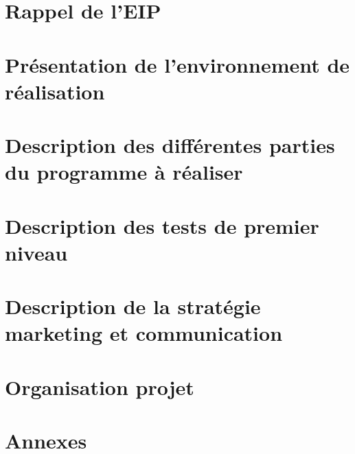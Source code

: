 \documentclass[11pt]{report}
\begin{document}
\tableofcontents
{}
\thispagestyle{empty}

\chapter{Rappel de l'EIP}
\thispagestyle{EIP} %
\setcounter{page}{1} %



\chapter{Présentation de l'environnement de réalisation}
\thispagestyle{EIP} %








\chapter{Description des différentes parties du programme à réaliser}
\thispagestyle{EIP} %


\chapter{Description des tests de premier niveau}
\thispagestyle{EIP} %


\chapter{Description de la stratégie marketing et communication}
\thispagestyle{EIP} %


\chapter{Organisation projet}
\thispagestyle{EIP} %


\chapter{Annexes}
\thispagestyle{EIP} %

\end{document}
